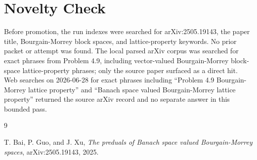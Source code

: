 \documentclass[11pt]{article}
\begin{document}
\section*{Novelty Check}

Before promotion, the run indexes were searched for arXiv:2505.19143, the
paper title, Bourgain-Morrey block spaces, and lattice-property keywords. No
prior packet or attempt was found. The local parsed arXiv corpus was searched
for exact phrases from Problem 4.9, including vector-valued Bourgain-Morrey
block-space lattice-property phrases; only the source paper surfaced as a
direct hit. Web searches on 2026-06-28 for exact phrases including
``Problem 4.9 Bourgain-Morrey lattice property'' and
``Banach space valued Bourgain-Morrey lattice property'' returned the source
arXiv record and no separate answer in this bounded pass.

\begin{thebibliography}{9}

T. Bai, P. Guo, and J. Xu,
\emph{The preduals of Banach space valued Bourgain-Morrey spaces},
arXiv:2505.19143, 2025.

\end{thebibliography}
\end{document}
